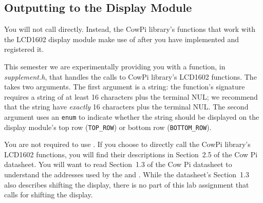 %
%


\subsection{Outputting to the Display Module}

You will not call  directly.
Instead, the CowPi library's functions that work with the LCD1602 display module make use of  after you have implemented and registered it.

This semester we are experimentally providing you with a function,  in \textit{supplement.h}, that handles the calls to CowPi library's LCD1602 functions.
The  takes two arguments.
The first argument is a string:
the function's signature requires a string of at least 16 characters plus the terminal NUL;
we recommend that the string have \textit{exactly} 16 characters plus the terminal NUL\@.
The second argument uses an \lstinline{enum} to indicate whether the string should be displayed on the display module's top row (\lstinline{TOP_ROW}) or bottom row (\lstinline{BOTTOM_ROW}).

You are not required to use .
If you choose to directly call the CowPi library's LCD1602 functions, you will find their descriptions in Section~2.5 of the Cow Pi datasheet.
You will want to read Section~1.3 of the Cow Pi datasheet to understand the addresses used by the  and .
While the datasheet's Section~1.3 also describes shifting the display, there is no part of this lab assignment that calls for shifting the display.

